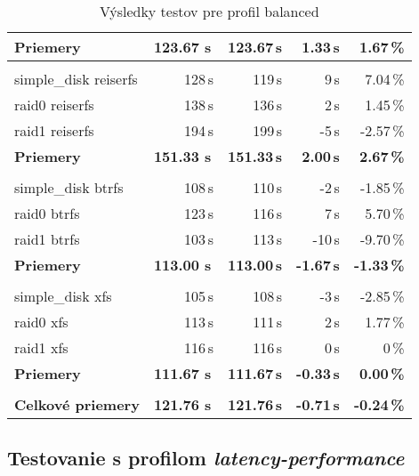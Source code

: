 \begin{table}[H]
\begin{center}
\begin{tabular}{|l|r r r r|}
    \textbf{Priemery} & \textbf{123.67 s}\,& \textbf{123.67\,s} & \textbf{1.33\,s} & \textbf{1.67\,\%} \\
    \hline & \\[-1em]\hline
    simple\_disk reiserfs & 128\,s & 119\,s & 9\,s & 7.04\,\% \\
    raid0 reiserfs & 138\,s & 136\,s & 2\,s & 1.45\,\% \\
    raid1 reiserfs & 194\,s & 199\,s & -5\,s & -2.57\,\% \\
    \hline
    \textbf{Priemery} & \textbf{151.33 s}\,& \textbf{151.33\,s} & \textbf{2.00\,s} & \textbf{2.67\,\%} \\
    \hline & \\[-1em]\hline
    simple\_disk btrfs & 108\,s & 110\,s & -2\,s & -1.85\,\% \\
    raid0 btrfs & 123\,s & 116\,s & 7\,s & 5.70\,\% \\
    raid1 btrfs & 103\,s & 113\,s & -10\,s & -9.70\,\% \\
    \hline
    \textbf{Priemery} & \textbf{113.00 s}\,& \textbf{113.00\,s} & \textbf{-1.67\,s} & \textbf{-1.33\,\%} \\
    \hline & \\[-1em]\hline
    simple\_disk xfs & 105\,s & 108\,s & -3\,s & -2.85\,\% \\
    raid0 xfs & 113\,s & 111\,s & 2\,s & 1.77\,\% \\
    raid1 xfs & 116\,s & 116\,s & 0\,s & 0\,\% \\
    \hline
    \textbf{Priemery} & \textbf{111.67 s}\,& \textbf{111.67\,s} & \textbf{-0.33\,s} & \textbf{0.00\,\%} \\
    \hline & \\[-1em]\hline
    \textbf{Celkové priemery} & \textbf{121.76 s}\,& \textbf{121.76\,s} & \textbf{-0.71\,s} & \textbf{-0.24\,\%} \\
    \hline
\end{tabular}
\caption{Výsledky testov pre profil balanced}
\label{tab:results-xfs}
\end{center}
\end{table}

\subsection{Testovanie s profilom \emph{latency-performance}}

